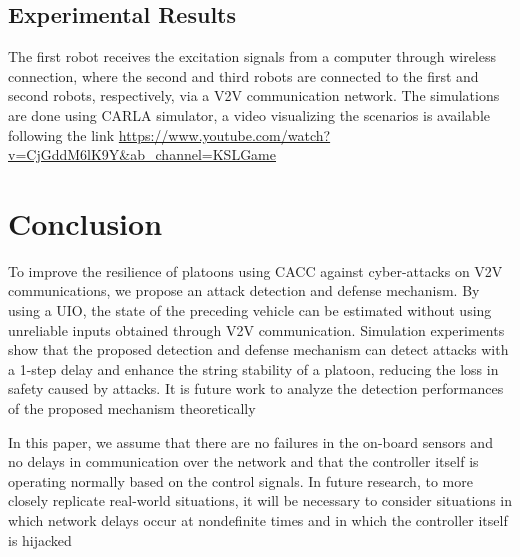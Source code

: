 \documentclass[letterpaper, 10 pt, conference]{ieeeconf}  %
\begin{document}
\subsection{Experimental Results}
The first robot receives the excitation signals from a computer through wireless
connection, where the second and third robots are connected to the first and second robots, respectively, via a V2V
communication network. The simulations are done using CARLA  simulator, a video visualizing the scenarios is available following the link \url{https://www.youtube.com/watch?v=CjGddM6lK9Y&ab_channel=KSLGame}

\section{Conclusion}
To improve the resilience of platoons using CACC against cyber-attacks on V2V communications, we propose an attack detection and defense mechanism. By using a UIO, the state
of the preceding vehicle can be estimated without using unreliable inputs obtained through V2V communication. Simulation experiments show that the proposed detection and
defense mechanism can detect attacks with a 1-step delay and
enhance the string stability of a platoon, reducing the loss in
safety caused by attacks. It is future work to analyze the detection performances of the proposed mechanism theoretically

In this paper, we assume that there are no failures in the
on-board sensors and no delays in communication over the
network and that the controller itself is operating normally
based on the control signals. In future research, to more
closely replicate real-world situations, it will be necessary
to consider situations in which network delays occur at nondefinite times and in which the controller itself is hijacked

\end{document}

